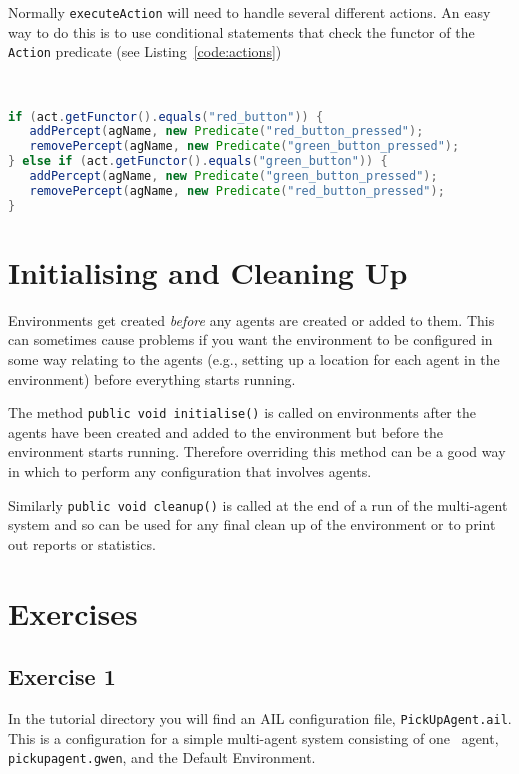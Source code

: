Normally \texttt{executeAction} will need to handle several different actions.  An easy way to do this is to use conditional statements that check the functor of the \texttt{Action} predicate (see Listing~\ref{code:actions})

\begin{ourexample}
\label{code:actions} \quad \\
\begin{lstlisting}[basicstyle=\sffamily,language=Java,style=easslisting]
if (act.getFunctor().equals("red_button")) {
   addPercept(agName, new Predicate("red_button_pressed");
   removePercept(agName, new Predicate("green_button_pressed");
} else if (act.getFunctor().equals("green_button")) {
   addPercept(agName, new Predicate("green_button_pressed");
   removePercept(agName, new Predicate("red_button_pressed");
}
\end{lstlisting}
\end{ourexample}

\section{Initialising and Cleaning Up}
Environments get created \emph{before} any agents are created or added to them.  This can sometimes cause problems if you want the environment to be configured in some way relating to the agents (e.g., setting up a location for each agent in the environment) before everything starts running.

The method \texttt{public void initialise()} is called on environments after the agents have been created and added to the environment but before the environment starts running.  Therefore overriding this method can be a good way in which to perform any configuration that involves agents.

Similarly \texttt{public void cleanup()} is called at the end of a run of the multi-agent system and so can be used for any final clean up of the environment or to print out reports or statistics.

\section{Exercises}

\subsection{Exercise 1}
In the tutorial directory you will find an AIL configuration file, \texttt{PickUpAgent.ail}.  This is a configuration for a simple multi-agent system consisting of one \gwendolen\ agent, \texttt{pickupagent.gwen}, and the Default Environment.

